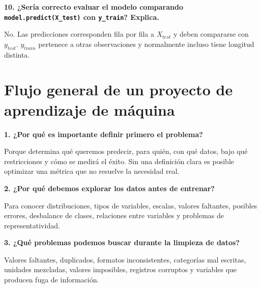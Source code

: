 \documentclass[11pt]{article}
\newcommand{\pregunta}[1]{\vspace{2mm}\textbf{#1}}
\begin{document}
\pregunta{10. ¿Sería correcto evaluar el modelo comparando \texttt{model.predict(X\_test)} con \texttt{y\_train}? Explica.}
\begin{respuesta}
No. Las predicciones corresponden fila por fila a $X_{test}$ y deben compararse con $y_{test}$. $y_{train}$ pertenece a otras observaciones y normalmente incluso tiene longitud distinta.
\end{respuesta}

\section{Flujo general de un proyecto de aprendizaje de máquina}

\begin{center}
\end{center}

\pregunta{1. ¿Por qué es importante definir primero el problema?}
\begin{respuesta}
Porque determina qué queremos predecir, para quién, con qué datos, bajo qué restricciones y cómo se medirá el éxito. Sin una definición clara es posible optimizar una métrica que no resuelve la necesidad real.
\end{respuesta}

\pregunta{2. ¿Por qué debemos explorar los datos antes de entrenar?}
\begin{respuesta}
Para conocer distribuciones, tipos de variables, escalas, valores faltantes, posibles errores, desbalance de clases, relaciones entre variables y problemas de representatividad.
\end{respuesta}

\pregunta{3. ¿Qué problemas podemos buscar durante la limpieza de datos?}
\begin{respuesta}
Valores faltantes, duplicados, formatos inconsistentes, categorías mal escritas, unidades mezcladas, valores imposibles, registros corruptos y variables que producen fuga de información.
\end{respuesta}
\end{document}
